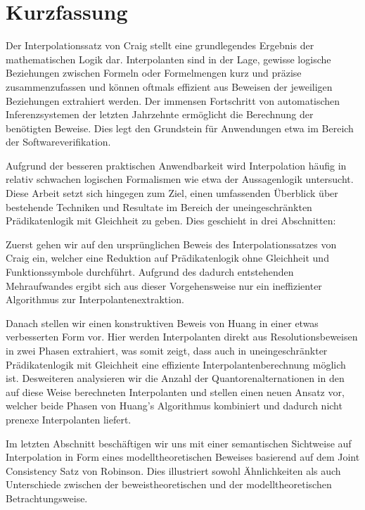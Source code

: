 \chapter*{Kurzfassung}

Der Interpolationssatz von Craig stellt eine grundlegendes Ergebnis der mathematischen Logik dar.
Interpolanten sind in der Lage, gewisse logische Beziehungen zwischen Formeln oder Formelmengen kurz und präzise zusammenzufassen und können oftmals effizient aus Beweisen der jeweiligen Beziehungen extrahiert werden.
Der immensen Fortschritt von automatischen Inferenzsystemen der letzten Jahrzehnte ermöglicht die Berechnung der benötigten Beweise.
Dies legt den Grundstein für Anwendungen etwa im Bereich der Softwareverifikation.

Aufgrund der besseren praktischen Anwendbarkeit wird Interpolation häufig in relativ schwachen logischen Formalismen wie etwa der Aussagenlogik untersucht.
Diese Arbeit setzt sich hingegen zum Ziel, einen umfassenden Überblick über bestehende Techniken und Resultate im Bereich der uneingeschränkten Prädikatenlogik mit Gleichheit zu geben.
Dies geschieht in drei Abschnitten:

Zuerst gehen wir auf den ursprünglichen Beweis des Interpolationssatzes von Craig ein, welcher eine Reduktion auf Prädikatenlogik ohne Gleichheit und Funktionssymbole durchführt.
Aufgrund des dadurch entstehenden Mehraufwandes ergibt sich aus dieser Vorgehensweise nur ein ineffizienter Algorithmus zur Interpolantenextraktion.

Danach stellen wir einen konstruktiven Beweis von Huang in einer etwas verbesserten Form vor.
Hier werden Interpolanten direkt aus Resolutionsbeweisen in zwei Phasen extrahiert, was somit zeigt, dass auch in uneingeschränkter Prädikatenlogik mit Gleichheit eine effiziente Interpolantenberechnung möglich ist.
Desweiteren analysieren wir die Anzahl der Quantorenalternationen in den auf diese Weise berechneten Interpolanten und stellen einen neuen Ansatz vor, welcher beide Phasen von Huang's Algorithmus kombiniert und dadurch nicht prenexe Interpolanten liefert.

Im letzten Abschnitt beschäftigen wir uns mit einer semantischen Sichtweise auf Interpolation in Form eines modelltheoretischen Beweises basierend auf dem Joint Consistency Satz von Robinson.
Dies illustriert sowohl Ähnlichkeiten als auch Unterschiede zwischen der beweistheoretischen und der modelltheoretischen Betrachtungsweise.




